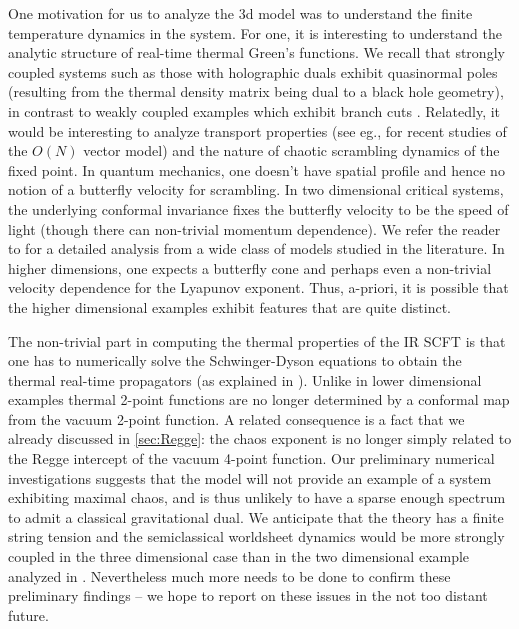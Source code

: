 \documentclass[11pt]{article}
\begin{document}
One motivation for us to  analyze the 3d model was to understand the finite temperature dynamics in the system. For one, it is interesting to understand the analytic structure of real-time thermal Green's functions. We recall that strongly coupled systems such as those with holographic duals exhibit quasinormal poles (resulting from the thermal density matrix being dual to a black hole geometry), in contrast to weakly coupled examples which exhibit branch cuts \cite{Hartnoll:2005ju}. Relatedly, it would be interesting to analyze transport properties  (see eg., \cite{Romatschke:2019ybu,Romatschke:2019gck} for recent studies of the $O(N)$ vector model) and the nature of chaotic scrambling dynamics of the fixed point. In quantum mechanics, one doesn't have spatial profile and hence no notion of a butterfly velocity for scrambling. In two dimensional critical systems, the underlying conformal invariance fixes the butterfly velocity to be the speed of light (though there can non-trivial momentum dependence).   We refer the reader to \cite{Mezei:2019dfv} for a detailed analysis from a wide class of models studied in the literature.  In higher dimensions, one expects a butterfly cone and perhaps even  a non-trivial velocity dependence for the Lyapunov exponent. Thus, a-priori, it is possible that the higher dimensional examples exhibit features that are quite distinct.  

The non-trivial part in computing the thermal properties of the IR SCFT is that one has to numerically solve the Schwinger-Dyson equations to obtain the thermal real-time propagators (as explained in \cite{Maldacena:2016hyu}). Unlike in lower dimensional examples thermal 2-point functions are no longer determined by a conformal map from the vacuum 2-point function. A related consequence is a fact that we already discussed in \cref{sec:Regge}: the chaos exponent is no longer simply related to the Regge intercept of the vacuum 4-point function. Our preliminary numerical investigations \cite{Chang:2021tch} suggests that the model will not provide an example of a system exhibiting maximal chaos, and is thus unlikely to have a sparse enough spectrum to admit a classical gravitational dual. We anticipate that the theory has a finite string tension and the semiclassical worldsheet dynamics would be more strongly coupled in the three dimensional case than in the two dimensional example analyzed in \cite{Murugan:2017eto}. Nevertheless much more needs to be done to confirm these preliminary findings -- we hope to report on these issues in the not too distant future.
\end{document}
